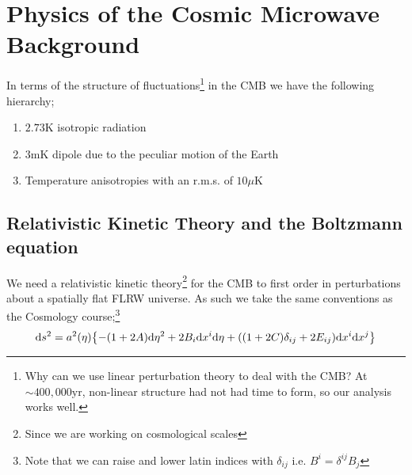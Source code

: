 \section{Physics of the Cosmic Microwave Background}
In terms of the structure of fluctuations\footnote{Why can we use linear perturbation theory to deal with the CMB? At $\sim 400,000\text{yr}$, non-linear structure had not had time to form, so our analysis works well.} in the CMB we have the following hierarchy;
\begin{enumerate}
\item $2.73\text{K}$ isotropic radiation
\item $3\text{mK}$ dipole due to the peculiar motion of the Earth
\item Temperature anisotropies with an r.m.s. of $10\mu\text{K}$
\end{enumerate}
\subsection{Relativistic Kinetic Theory and the Boltzmann equation}
We need a relativistic kinetic theory\footnote{Since we are working on cosmological scales} for the CMB to first order in perturbations about a spatially flat FLRW universe. As such we take the same conventions as the Cosmology course;\footnote{Note that we can raise and lower latin indices with $\delta_{ij}$ i.e. $B^i = \delta^{ij}B_j$}
\begin{equation}
\label{eq:flrwvar}
\ud s^2 = a^2 (\eta)\set{-(1 + 2A)\ud \eta^2 + 2 B_i \ud x^i \ud \eta  + \left((1 + 2C)\delta_{ij} + 2E_{ij}\right)\ud x^i \ud x^j}
\end{equation}
